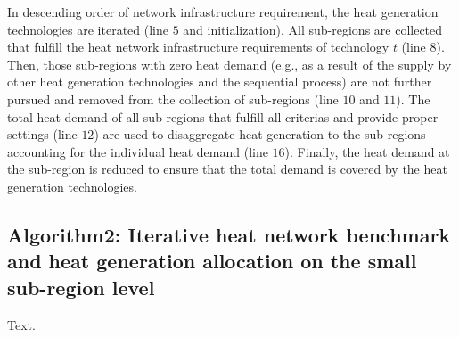 In descending order of network infrastructure requirement, the heat generation technologies are iterated (line $5$ and initialization). All sub-regions are collected that fulfill the heat network infrastructure requirements of technology $t$ (line $8$). Then, those sub-regions with zero heat demand (e.g., as a result of the supply by other heat generation technologies and the sequential process) are not further pursued and removed from the collection of sub-regions (line $10$ and $11$). The total heat demand of all sub-regions that fulfill all criterias and provide proper settings (line $12$) are used to disaggregate heat generation to the sub-regions accounting for the individual heat demand (line $16$). Finally, the heat demand at the sub-region is reduced to ensure that the total demand is covered by the heat generation technologies. 

\subsection{Algorithm2: Iterative heat network benchmark and heat generation allocation on the small sub-region level}
Text.



